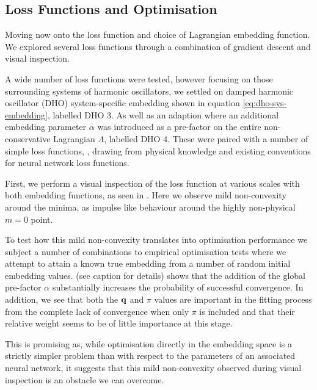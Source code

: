 \subsection{Loss Functions and Optimisation}
\label{sec:res-lf}

Moving now onto the loss function and choice of Lagrangian embedding function. We explored several loss functions through a combination of gradient descent and visual inspection.

A wide number of loss functions were tested, however focusing on those surrounding systems of harmonic oscillators, we settled on damped harmonic oscillator (DHO) system-specific embedding shown in equation \eqref{eq:dho-sys-embedding}, labelled DHO 3.
As well as an adaption where an additional embedding parameter $\alpha$ was introduced as a pre-factor on the entire non-conservative Lagrangian $\Lambda$, labelled DHO 4. 
These were paired with a number of simple loss functions, , drawing from physical knowledge and existing conventions for neural network loss functions.

First, we perform a visual inspection of the  loss function at various scales with both embedding functions, as seen in . Here we observe mild non-convexity around the minima, as impulse like behaviour around the highly non-physical $m = 0$ point.

To test how this mild non-convexity translates into optimisation performance we subject a number of combinations to empirical optimisation tests where we attempt to attain a known true embedding from a number of random initial embedding values.  (see caption for details) shows that the addition of the global pre-factor $\alpha$ substantially increases the probability of successful convergence.  In addition, we see that both the $\vb{q}$ and $\pi$ values are important in the fitting process from the complete lack of convergence when only $\pi$ is included and that their relative weight seems to be of little importance at this stage.

This is promising as, while optimisation directly in the embedding space is a strictly simpler problem than with respect to the parameters of an associated neural network, it suggests that this mild non-convexity observed during visual inspection is an obstacle we can overcome.

